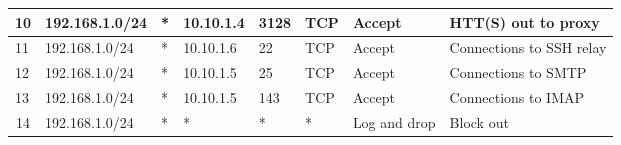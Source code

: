 \documentclass[a4paper, 11pt, oneside]{article}
\begin{document}
\begin{table}[H]
{\begin{tabular}{|llllllll|}
\multicolumn{1}{|l|}{10}                        & \multicolumn{1}{l|}{192.168.1.0/24}                                               & \multicolumn{1}{l|}{*}                                                              & \multicolumn{1}{l|}{10.10.1.4}                                                         & \multicolumn{1}{l|}{3128}                                                                & \multicolumn{1}{l|}{TCP}               & \multicolumn{1}{l|}{Accept}          & HTT(S) out to proxy                    \\ \hline
\multicolumn{1}{|l|}{11}                        & \multicolumn{1}{l|}{192.168.1.0/24}                                               & \multicolumn{1}{l|}{*}                                                              & \multicolumn{1}{l|}{10.10.1.6}                                                         & \multicolumn{1}{l|}{22}                                                                  & \multicolumn{1}{l|}{TCP}               & \multicolumn{1}{l|}{Accept}          & Connections to SSH relay               \\ \hline
\multicolumn{1}{|l|}{12}                        & \multicolumn{1}{l|}{192.168.1.0/24}                                               & \multicolumn{1}{l|}{*}                                                              & \multicolumn{1}{l|}{10.10.1.5}                                                         & \multicolumn{1}{l|}{25}                                                                  & \multicolumn{1}{l|}{TCP}               & \multicolumn{1}{l|}{Accept}          & Connections to SMTP                    \\ \hline
\multicolumn{1}{|l|}{13}                        & \multicolumn{1}{l|}{192.168.1.0/24}                                               & \multicolumn{1}{l|}{*}                                                              & \multicolumn{1}{l|}{10.10.1.5}                                                         & \multicolumn{1}{l|}{143}                                                                 & \multicolumn{1}{l|}{TCP}               & \multicolumn{1}{l|}{Accept}          & Connections to IMAP                    \\ \hline
\multicolumn{1}{|c|}{{\color[HTML]{000000} 14}} & \multicolumn{1}{l|}{192.168.1.0/24}                                               & \multicolumn{1}{l|}{*}                                                              & \multicolumn{1}{l|}{*}                                                                 & \multicolumn{1}{l|}{*}                                                                   & \multicolumn{1}{l|}{*}                 & \multicolumn{1}{l|}{Log and drop}    & Block out                              \\ \hline

\end{tabular}}
\end{table}
\end{document}

